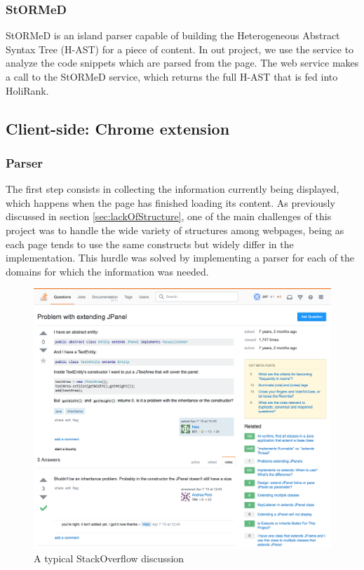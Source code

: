 \subsubsection{StORMeD}
StORMeD\cite{Ponz2015a} is an island parser capable of building the Heterogeneous Abstract Syntax Tree (H-AST) for a piece of content. In out project, we use the service to analyze the code snippets which are parsed from the page. The web service makes a call to the StORMeD service, which returns the full H-AST that is fed into HoliRank\cite{Ponz2017b}.

\subsection{Client-side: Chrome extension}
\subsubsection{Parser}
The first step consists in collecting the information currently being displayed, which happens when the page has finished loading its content. As previously discussed in section \ref{sec:lackOfStructure}, one of the main challenges of this project was to handle the wide variety of structures among webpages, being as each page tends to use the same constructs but widely differ in the implementation. This hurdle was solved by implementing a parser for each of the domains for which the information was needed. 

\begin{figure}[H]
\centering
\includegraphics[scale=0.3]{Figures/SOConv}
\caption{A typical StackOverflow discussion}
\label{fig:soConv}
\end{figure}

